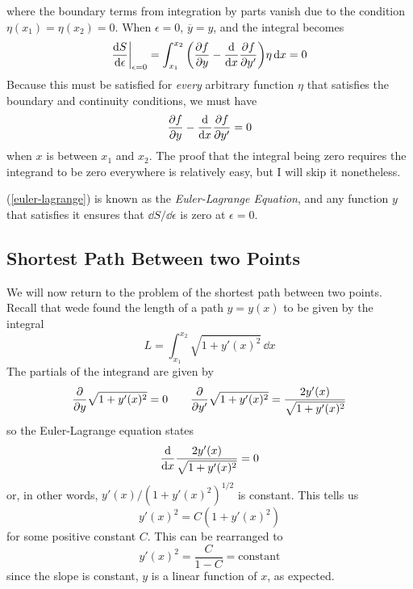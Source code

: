 where the boundary terms from integration by parts vanish due to the condition $\eta(x_1) = \eta(x_2) = 0$. When $\epsilon = 0$, $\overline y = y$, and the integral becomes
\[ \dv{S}{\epsilon}\biggr|_{\epsilon = 0} = \int_{x_1}^{x_2} \pqty{\pdv{f}{y} - \dv{x} \pdv{f}{y'}}\eta \, \dd x = 0\]
Because this must be satisfied for \textit{every} arbitrary function $\eta$ that satisfies the boundary and continuity conditions, we must have
\begin{align} \label{euler-lagrange}
    \pdv{f}{y} - \dv{x}\pdv{f}{y'} = 0
\end{align}
when $x$ is between $x_1$ and $x_2$. The proof that the integral being zero requires the integrand to be zero everywhere is relatively easy, but I will skip it nonetheless. 

(\ref{euler-lagrange}) is known as the \textit{Euler-Lagrange Equation}, and any function $y$ that satisfies it ensures that $\dd S/\dd \epsilon$ is zero at $\epsilon = 0$. 
\subsection*{Shortest Path Between two Points}
We will now return to the problem of the shortest path between two points. Recall that wede found the length of a path $y = y(x)$ to be given by the integral
\[ L = \int_{x_1}^{x_2}\sqrt{1 + y'(x)^2}\, \dd x \]
The partials of the integrand are given by
\[ \pdv{y} \sqrt{1+y'(x)^2} = 0 \quad\quad \pdv{y'}\sqrt{1+y'(x)^2} = \frac{2y'(x)}{\sqrt{1+y'(x)^2}} \]
so the Euler-Lagrange equation states
\[ \dv{x} \frac{2y'(x)}{\sqrt{1+y'(x)^2}} = 0\]
or, in other words, $y'(x)/(1+y'(x)^2)^{1/2}$ is constant. This tells us
\[ y'(x)^2 = C(1+y'(x)^2)\]
for some positive constant $C$. This can be rearranged to
\[ y'(x)^2 = \frac{C}{1-C} = \text{constant} \]
since the slope is constant, $y$ is a linear function of $x$, as expected. 

